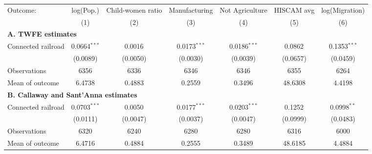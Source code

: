 \begin{tabular}{lcccccc}
  \toprule
  Outcome: & log(Pop.) & Child-women ratio & Manufacturing & Not Agriculture & HISCAM avg & log(Migration) \\
           & (1) & (2) & (3) & (4) & (5) & (6) \\
  \midrule
  \multicolumn{7}{l}{\textbf{A. TWFE estimates}}\\
  Connected railroad &  0.0664$^{***}$ & 0.0016$^{}$ & 0.0173$^{***}$ & 0.0186$^{***}$ & 0.0862$^{}$ & 0.1353$^{***}$  \\
                    &  (0.0089) & (0.0050) & (0.0030) & (0.0039) & (0.0657) & (0.0459)  \\
  \cmidrule(lr){2-7}
  Observations      &  6356 & 6336 & 6346 & 6346 & 6355 & 6264  \\
  Mean of outcome   &  6.4738 & 0.4883 & 0.2559 & 0.3496 & 48.6308 & 4.4198  \\
  \midrule
  \multicolumn{7}{l}{\textbf{B. Callaway and Sant'Anna estimates}}\\
  Connected railroad &  0.0703$^{***}$ & 0.0050$^{}$ & 0.0177$^{***}$ & 0.0203$^{***}$ & 0.1252$^{}$ & 0.0998$^{**}$  \\
                    &  (0.0111) & (0.0047) & (0.0037) & (0.0047) & (0.0999) & (0.0483)  \\
  \cmidrule(lr){2-7}
  Observations      &  6320 & 6240 & 6280 & 6280 & 6316 & 6000  \\
  Mean of outcome   &  6.4716 & 0.4884 & 0.2555 & 0.3489 & 48.6185 & 4.4884  \\
  \bottomrule
\end{tabular}
